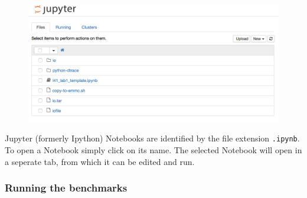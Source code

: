\documentclass[a4paper,10pt]{article}
\begin{document}
\begin{figure}[H]
\includegraphics[width=\linewidth]{jupyter_home.png}
\end{figure}

Jupyter (formerly Ipython) Notebooks are identified by the file extension
\texttt{.ipynb}. To open a Notebook simply click on its name. The selected
Notebook will open in a seperate tab, from which it can be edited and run.

\subsubsection*{Running the benchmarks}
\end{document}
